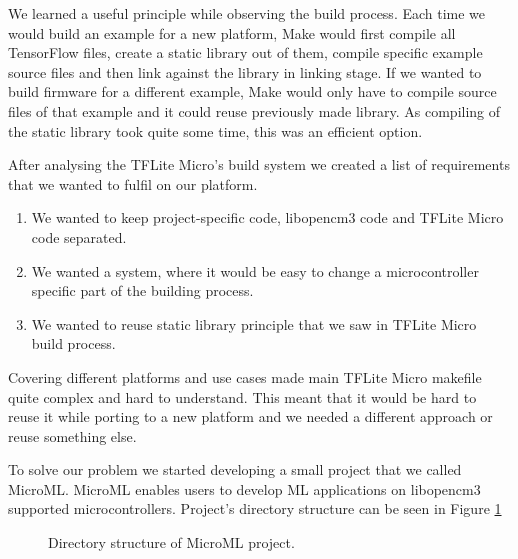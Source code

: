 We learned a useful principle while observing the build process. 
Each time we would build an example for a new platform, Make would first compile all TensorFlow files, create a static library out of them, compile specific example source files and then link against the library in linking stage.
If we wanted to build firmware for a different example, Make would only have to compile source files of that example and it could reuse previously made library.
As compiling of the static library took quite some time, this was an efficient option.

After analysing the TFLite Micro's build system we created a list of requirements that we wanted to fulfil on our platform.

\begin{enumerate}
    \item We wanted to keep project-specific code, libopencm3 code and TFLite Micro code separated.
    \item We wanted a system, where it would be easy to change a microcontroller specific part of the building process.
    \item We wanted to reuse static library principle that we saw in TFLite Micro build process.
\end{enumerate}

Covering different platforms and use cases made main TFLite Micro makefile quite complex and hard to understand.
This meant that it would be hard to reuse it while porting to a new platform and we needed a different approach or reuse something else.

To solve our problem we started developing a small project that we called MicroML\footnotemark.
MicroML enables users to develop ML applications on libopencm3 supported microcontrollers.
Project's directory structure can be seen in Figure \ref{microml_dir}


\begin{figure}[ht] 
    \centering
    \begin{minipage}{7cm}
    \end{minipage}
    \caption{ Directory structure of MicroML project.}
    \label{microml_dir}
\end{figure}

